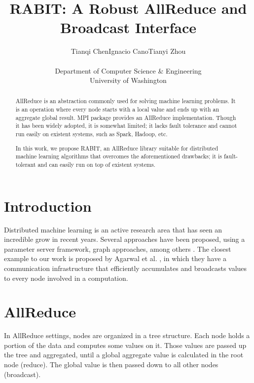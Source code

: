 \documentclass[10pt,twocolumn]{article}
\newcommand{\todo}[1]{\noindent{\textcolor{red}{\{{\bf TODO:}  #1\}}}}
\begin{document}
\title{\bf RABIT: A Robust AllReduce and Broadcast Interface}
\author{Tianqi Chen\hspace{0.5in}Ignacio Cano\hspace{0.5in}Tianyi Zhou \\\\
Department of Computer Science \& Engineering \\
University of Washington\\
}
\date{}
\maketitle
\thispagestyle{empty}

\begin{abstract}

AllReduce is an abstraction commonly used for solving machine learning problems. It is an operation where every node starts with a local value and ends up with an aggregate global result.
MPI package provides an AllReduce implementation. Though it has been widely adopted, it is somewhat limited; it lacks fault tolerance and cannot run easily on existent systems, such as Spark, Hadoop, etc.

In this work, we propose RABIT, an AllReduce library suitable for distributed machine learning algorithms that overcomes the aforementioned drawbacks; it is fault-tolerant and can easily run on top of existent systems.

\end{abstract}

\section{Introduction}
Distributed machine learning is an active research area that has seen an incredible grow in recent years. Several approaches have been proposed, using a parameter server framework, graph approaches, among others \cite{paramServer,DuchiAW12,Zinkevich,Dekel,Low}. The closest example to our work is proposed by Agarwal et al. \cite{Agarwal}, in which they have a  communication infrastructure that efficiently accumulates and broadcasts values to every node involved in a computation.
\todo {add more stuff}


\section{AllReduce}

In AllReduce settings, nodes are organized in a tree structure. Each node holds a portion of the data and computes some values on it. Those values are passed up the tree and aggregated, until a global aggregate value is calculated in the root node (reduce). The global value is then passed down to all other nodes (broadcast). 
\end{document}
